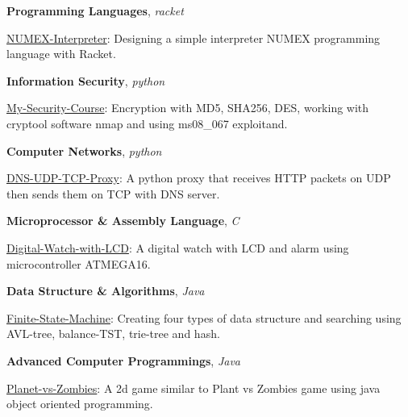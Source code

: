 \documentclass[letterpaper,MMMyyyy,nonstopmode]{simpleresumecv}
\begin{document}
\begin{Body}
\begin{multicols}{2}
\begin{itemize}[leftmargin=*]
\BulletItem
\textbf{Programming Languages},
\textit{\small{racket}}
\begin{Detail}
\Item
\href{https://github.com/aliyazdi75/NUMEX-Interpreter}
{NUMEX-Interpreter}:
Designing a simple interpreter
NUMEX programming language with Racket.
\end{Detail}

\Gap
\BulletItem
\textbf{Information Security},
\textit{\small{python}}
\begin{Detail}
\Item
\href{https://github.com/aliyazdi75/My-Security-Course}
{My-Security-Course}:
Encryption with MD5, SHA256, DES,
working with cryptool software nmap
and using ms08\_067 exploitand.
\end{Detail}

\Gap
\BulletItem
\textbf{Computer Networks},
\textit{\small{python}}
\begin{Detail}
\Item
\href{https://github.com/aliyazdi75/DNS-UDP-TCP-Proxy}
{DNS-UDP-TCP-Proxy}:
A python proxy that receives HTTP packets on UDP
then sends them on TCP with DNS server.
\end{Detail}

\columnbreak

\BulletItem
\textbf{Microprocessor \& Assembly Language},
\textit{\small{C}}
\begin{Detail}
\Item
\href{https://github.com/aliyazdi75/Digital-Watch-with-LCD}
{Digital-Watch-with-LCD}:
A digital watch with LCD and
alarm using microcontroller ATMEGA16.
\end{Detail}

\Gap
\BulletItem
\textbf{Data Structure \& Algorithms},
\textit{\small{Java}}
\begin{Detail}
\Item
\href{https://github.com/aliyazdi75/Finite-State-Machine}
{Finite-State-Machine}:
Creating four types of data structure and searching using
AVL-tree, balance-TST, trie-tree and hash.
\end{Detail}

\Gap
\BulletItem
\textbf{Advanced Computer Programmings},
\textit{\small{Java}}
\begin{Detail}
\Item
\href{https://github.com/aliyazdi75/Planet\_vs\_Zombies}
{Planet-vs-Zombies}:
A 2d game similar to Plant vs Zombies game
using java object oriented programming.
\end{Detail}

\end{itemize}
\end{multicols}


\end{Body}
\end{document}
